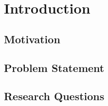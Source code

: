 \section{Introduction}
\label{sec:introduction}

\subsection{Motivation}
\label{ssec:motivation}

\subsection{Problem Statement}
\label{ssec:problem-statement}

\subsection{Research Questions}
\label{ssec:research-questions}
